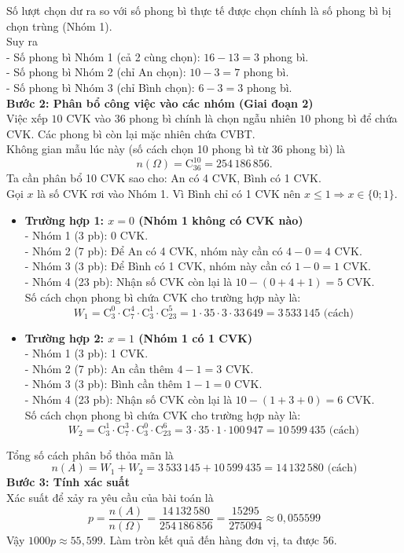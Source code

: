 \begin{ex}
{		Số lượt chọn dư ra so với số phong bì thực tế được chọn chính là số phong bì bị chọn trùng (Nhóm 1).\\
		Suy ra\\
		- Số phong bì Nhóm 1 (cả 2 cùng chọn): $16 - 13 = 3$ phong bì.\\
		- Số phong bì Nhóm 2 (chỉ An chọn): $10 - 3 = 7$ phong bì.\\
		- Số phong bì Nhóm 3 (chỉ Bình chọn): $6 - 3 = 3$ phong bì.\\
		\textbf{Bước 2: Phân bổ công việc vào các nhóm (Giai đoạn 2)}\\
		Việc xếp $10$ CVK vào $36$ phong bì chính là chọn ngẫu nhiên $10$ phong bì để chứa CVK. Các phong bì còn lại mặc nhiên chứa CVBT.\\
		Không gian mẫu lúc này (số cách chọn 10 phong bì từ 36 phong bì) là
		$$n(\Omega) = \mathrm{C}_{36}^{10} = 254\,186\,856.$$
		Ta cần phân bổ 10 CVK sao cho: An có 4 CVK, Bình có 1 CVK.\\
		Gọi $x$ là số CVK rơi vào Nhóm 1. Vì Bình chỉ có 1 CVK nên $x \le 1 \Rightarrow x \in \{0; 1\}$.
		\begin{itemize}
			\item \textbf{Trường hợp 1: $x = 0$ (Nhóm 1 không có CVK nào)}\\
			- Nhóm 1 (3 pb): 0 CVK.\\
			- Nhóm 2 (7 pb): Để An có 4 CVK, nhóm này cần có $4 - 0 = 4$ CVK.\\
			- Nhóm 3 (3 pb): Để Bình có 1 CVK, nhóm này cần có $1 - 0 = 1$ CVK.\\
			- Nhóm 4 (23 pb): Nhận số CVK còn lại là $10 - (0+4+1) = 5$ CVK.\\
			Số cách chọn phong bì chứa CVK cho trường hợp này là:
			$$W_1 = \mathrm{C}_3^0 \cdot \mathrm{C}_7^4 \cdot \mathrm{C}_3^1 \cdot \mathrm{C}_{23}^5 = 1 \cdot 35 \cdot 3 \cdot 33\,649 = 3\,533\,145 \text{ (cách)}$$
			\item \textbf{Trường hợp 2: $x = 1$ (Nhóm 1 có 1 CVK)}\\
			- Nhóm 1 (3 pb): 1 CVK.\\
			- Nhóm 2 (7 pb): An cần thêm $4 - 1 = 3$ CVK.\\
			- Nhóm 3 (3 pb): Bình cần thêm $1 - 1 = 0$ CVK.\\
			- Nhóm 4 (23 pb): Nhận số CVK còn lại là $10 - (1+3+0) = 6$ CVK.\\
			Số cách chọn phong bì chứa CVK cho trường hợp này là:
			$$W_2 = \mathrm{C}_3^1 \cdot \mathrm{C}_7^3 \cdot \mathrm{C}_3^0 \cdot \mathrm{C}_{23}^6 = 3 \cdot 35 \cdot 1 \cdot 100\,947 = 10\,599\,435 \text{ (cách)}$$
		\end{itemize}
		Tổng số cách phân bổ thỏa mãn là
		$$n(A) = W_1 + W_2 = 3\,533\,145 + 10\,599\,435 = 14\,132\,580 \text{ (cách)}$$
		\textbf{Bước 3: Tính xác suất}\\
		Xác suất để xảy ra yêu cầu của bài toán là
		$$p = \dfrac{n(A)}{n(\Omega)} = \dfrac{14\,132\,580}{254\,186\,856} = \dfrac{15295}{275094} \approx 0,055599$$
		Vậy $1000p \approx 55,599$. Làm tròn kết quả đến hàng đơn vị, ta được $\boxed{56}$.
	}
\end{ex}